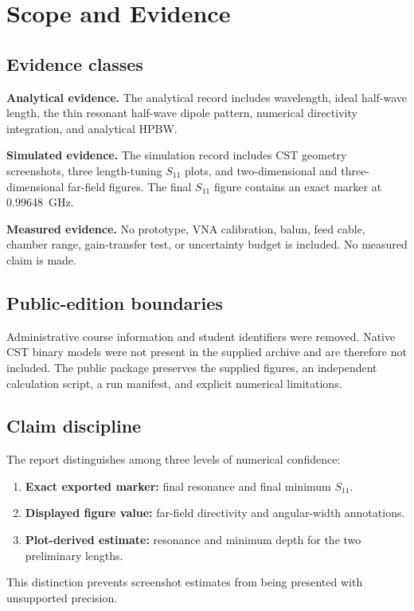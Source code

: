 \section{Scope and Evidence}

\subsection{Evidence classes}
\noindent
\textbf{Analytical evidence.}
The analytical record includes wavelength, ideal half-wave length, the thin resonant
half-wave dipole pattern, numerical directivity integration, and analytical HPBW.

\noindent
\textbf{Simulated evidence.}
The simulation record includes CST geometry screenshots, three length-tuning
$S_{11}$ plots, and two-dimensional and three-dimensional far-field figures. The final
$S_{11}$ figure contains an exact marker at \SI{0.99648}{GHz}.

\noindent
\textbf{Measured evidence.}
No prototype, VNA calibration, balun, feed cable, chamber range, gain-transfer test,
or uncertainty budget is included. No measured claim is made.

\subsection{Public-edition boundaries}
Administrative course information and student identifiers were removed. Native CST
binary models were not present in the supplied archive and are therefore not included.
The public package preserves the supplied figures, an independent calculation script,
a run manifest, and explicit numerical limitations.

\subsection{Claim discipline}
The report distinguishes among three levels of numerical confidence:
\begin{enumerate}[leftmargin=2em]
\item \textbf{Exact exported marker:} final resonance and final minimum $S_{11}$.
\item \textbf{Displayed figure value:} far-field directivity and angular-width annotations.
\item \textbf{Plot-derived estimate:} resonance and minimum depth for the two preliminary lengths.
\end{enumerate}
This distinction prevents screenshot estimates from being presented with unsupported
precision.
